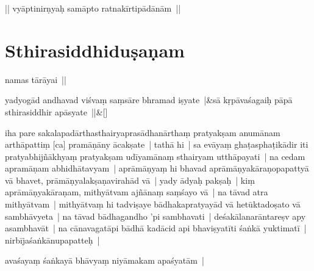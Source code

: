 \documentclass[article,12pt,a4paper]{memoir}%
\newcounter{parCount}
\begin{document}
	  \pstart \leavevmode%
	|| vyāptinirṇyaḥ samāpto ratnakīrtipādānām || 
	{}
	\pend%
      
	    
	    \endnumbering%
	    \endgroup
	    
	  
	  
	
	    
	    \begingroup
	    \beginnumbering%
	    
	  
\chapter*[{Sthirasiddhiduṣaṇam}]{Sthirasiddhiduṣaṇam}\label{Sthirasiddhiduṣaṇam}

	  \pstart \leavevmode%
	\label{thakur75-112.3}namas tārāyai ||
	{}
	\pend%
      
	    
	    \stanza[\smallbreak]
	  yadyogād andhavad viśvaṃ saṃsāre bhramad iṣyate |&sā kṛpāvaśagaiḥ pāpā sthirasiddhir apāsyate ||\&[\smallbreak]
	  
	  
	  

	  \pstart \leavevmode%
	\label{thakur75-112.6}iha pare sakalapadārthasthairyaprasādhanārthaṃ pratyakṣam anumānam arthāpattiṃ [ca] pramāṇāny ācakṣate | \label{thakur75-112.7} tathā hi | sa evāyaṃ ghaṭasphaṭikādir iti pratyabhijñākhyaṃ pratyakṣam udīyamānaṃ sthairyam utthāpayati | na cedam apramāṇam abhidhātavyam | aprāmāṇyaṃ hi bhavad aprāmāṇyakāraṇopapattyā vā bhavet, prāmāṇyalakṣaṇavirahād vā | \label{thakur75-112.9} yady ādyaḥ pakṣaḥ | kiṃ aprāmāṇyakāraṇam, mithyātvam ajñānaṃ saṃśayo vā | \label{thakur75-112.10} na tāvad atra mithyātvam | mithyātvaṃ hi tadviṣaye bādhakapratyayād vā hetūktadoṣato vā sambhāvyeta | \label{thakur75-112.11} na tāvad bādhagandho 'pi sambhavati | deśakālanarāntareṣv apy asambhavāt | na cānavagatāpi bādhā kadācid api bhaviṣyatīti śaṅkā yuktimatī | nirbījaśaṅkānupapatteḥ |
	{}
	\pend%
      

	  \pstart \leavevmode%
	avaśayaṃ śaṅkayā bhāvyaṃ niyāmakam apaśyatām | 
	{}
	\pend%
      
\end{document}
